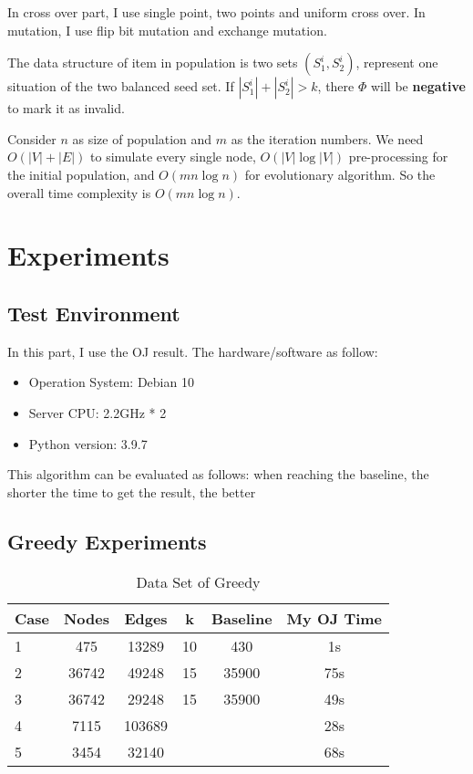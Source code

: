 \documentclass{article}
\begin{document}
In cross over part, I use single point, two points and uniform cross over. In mutation, I use flip bit mutation and exchange mutation.


The data structure of item in population is two sets $(S^i_1, S^i_2)$, represent one situation of the two balanced seed set. If $|S^i_1|+|S^i_2|>k$, there $\Phi$ will be \textbf{negative} to mark it as invalid.


Consider $n$ as size of population and $m$ as the iteration numbers. We need $O(|V|+|E|)$ to simulate every single node, $O(|V|\log |V|)$ pre-processing for the initial population, and $O(mn\log n)$ for evolutionary algorithm. So the overall time complexity is $O(mn\log n)$.

\section{Experiments}

\subsection{Test Environment}
In this part, I use the OJ result. The hardware/software as follow:
\begin{itemize}
    \item Operation System: Debian 10
    \item Server CPU: 2.2GHz * 2
    \item Python version: 3.9.7
\end{itemize}

This algorithm can be evaluated as follows: when reaching the baseline, the shorter the time to get the result, the better

\subsection{Greedy Experiments}

\begin{table}[!ht]
\centering
\caption{Data Set of Greedy}
\begin{tabular}{|l|c|c|c|c|c|} \hline
Case & Nodes & Edges & k & Baseline & My OJ Time  \\ \hline
1 & 475 & 13289 & 10 & 430 & 1s \\ \hline
2 &	36742 &	49248 & 15 & 35900 & 75s \\ \hline
3 & 36742 & 29248 & 15 & 35900 & 49s \\ \hline
4 & 7115 & 103689 & & & 28s \\ \hline
5 & 3454 & 32140 & & & 68s \\ \hline
\end{tabular}
\end{table}
\end{document}
